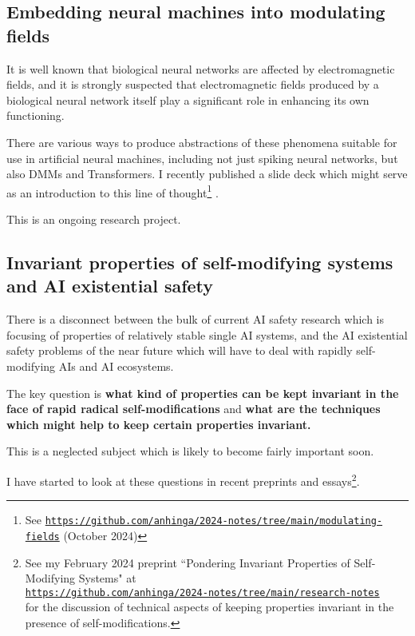 \documentclass{article}
\begin{document}
\subsection{Embedding neural machines into modulating fields}

It is well known that biological neural networks are affected by electromagnetic fields, and it is strongly suspected that
electromagnetic fields produced by a biological neural network itself play a significant role in enhancing its own functioning.

There are various ways to produce abstractions of these phenomena suitable for use in artificial neural machines,
including not just spiking neural networks, but also DMMs and Transformers. I recently published a slide deck which
might serve as an introduction to this line of thought\footnote{See 
\href{https://github.com/anhinga/2024-notes/tree/main/modulating-fields}{\tt https://github.com/anhinga/2024-notes/tree/main/modulating-fields} (October 2024)} .

This is an ongoing research project.

\subsection{Invariant properties of self-modifying systems and AI existential safety}

There is a disconnect between the bulk of current AI safety research which is focusing of properties of relatively stable
single AI systems, and the AI existential safety problems of the near future which will have to deal with
rapidly self-modifying AIs and AI ecosystems.

The key question is {\bf what kind of properties can be kept invariant in the face of rapid radical self-modifications}
and {\bf what are the techniques which might help to keep certain properties invariant.}

This is a neglected subject which is likely to become fairly important soon. 

I have started to look at these questions in recent preprints and essays\footnote{See my February 2024
preprint ``Pondering Invariant Properties of Self-Modifying Systems" at\\
\href{https://github.com/anhinga/2024-notes/tree/main/research-notes}{\tt https://github.com/anhinga/2024-notes/tree/main/research-notes}\\
for the discussion of technical aspects of keeping properties invariant in the presence of self-modifications.}. 
\end{document}
